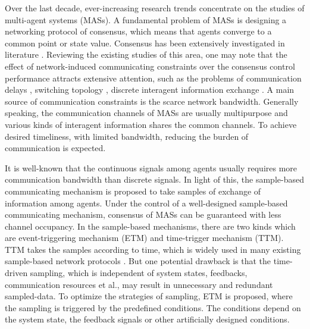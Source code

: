 \documentclass[review]{elsarticle}
\begin{document}
Over the last decade, ever-increasing research trends concentrate on the studies of multi-agent systems (MASs). A fundamental problem of MASs is designing a networking protocol of consensus, which means that agents converge to a common point or state value. Consensus has been extensively investigated in literature \cite{shang2020resilient,huang2020distributed}. Reviewing the existing studies of this area, one may note that the effect of network-induced communicating constraints over the consensus control performance attracts extensive attention, such as the problems of communication delays \cite{wang2020distributed}, switching topology \cite{Xie2015Event}, discrete interagent information exchange \cite{zhang2020semi}. 
A main source of communication constraints\cite{yan2020performance} is the scarce network bandwidth. Generally speaking, the communication channels of MASs are usually multipurpose and various kinds of interagent information shares the common channels. To achieve desired timeliness, with limited bandwidth, reducing the burden of communication is expected.

It is well-known that the continuous signals among agents usually requires more communication bandwidth than discrete signals. In light of this, the sample-based communicating mechanism is proposed to take samples of exchange of information among agents. Under the control of a well-designed sample-based communicating mechanism, consensus of MASs can be guaranteed with less channel occupancy. In the sample-based mechanisms, there are two kinds which are event-triggering mechanism (ETM) and time-trigger mechanism (TTM). 
TTM takes the samples according to time, which is widely used in many existing sample-based network protocols \cite{Xian2015Event,Zhang2016Survey}. But one potential drawback is that the time-driven sampling, which is independent of system states, feedbacks, communication resources et al., may result in unnecessary and redundant sampled-data\cite{8959085, Hetel2017Recent}. To optimize the strategies of sampling, ETM is proposed, where the sampling is triggered by the predefined conditions. The conditions depend on the system state, the feedback signals or other artificially designed conditions. 
\end{document}
